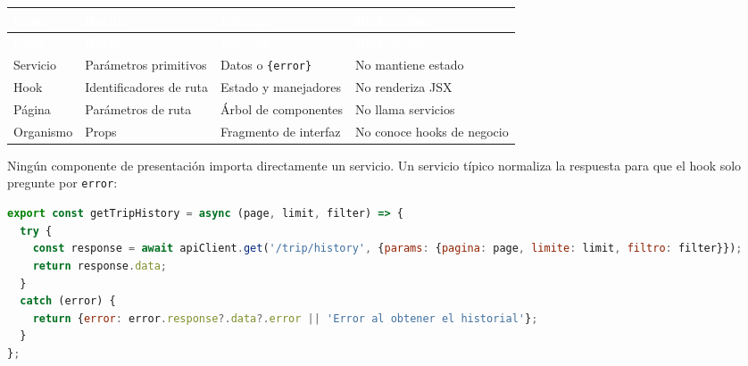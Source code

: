 \documentclass[11pt,letterpaper]{article}
\newcommand{\cabecera}{\rowcolor{maxamPrimario}}
\newcommand{\tth}[1]{\textcolor{white}{\textbf{#1}}}
\newcommand{\code}[1]{\nolinkurl{#1}}
\begin{document}
\begin{center}
\end{center}

\begin{xltabular}{\textwidth}{L{2.6cm} L{3.3cm} L{3.3cm} Y}
\cabecera \tth{Capa} & \tth{Recibe} & \tth{Entrega} & \tth{Restricción} \\
\endfirsthead
\cabecera \tth{Capa} & \tth{Recibe} & \tth{Entrega} & \tth{Restricción} \\
\endhead
{} Servicio & Parámetros primitivos & Datos o \texttt{\{error\}} & No mantiene estado \\
Hook & Identificadores de ruta & Estado y manejadores & No renderiza JSX \\
 Página & Parámetros de ruta & Árbol de componentes & No llama servicios \\
Organismo & Props & Fragmento de interfaz & No conoce hooks de negocio \\
\end{xltabular}

Ningún componente de presentación importa directamente un servicio. Un servicio típico normaliza la respuesta para que el hook solo pregunte por \code{error}:

\begin{lstlisting}[language=JavaScript]
export const getTripHistory = async (page, limit, filter) => {
  try {
    const response = await apiClient.get('/trip/history', {params: {pagina: page, limite: limit, filtro: filter}});
    return response.data;
  }
  catch (error) {
    return {error: error.response?.data?.error || 'Error al obtener el historial'};
  }
};
\end{lstlisting}
\end{document}
